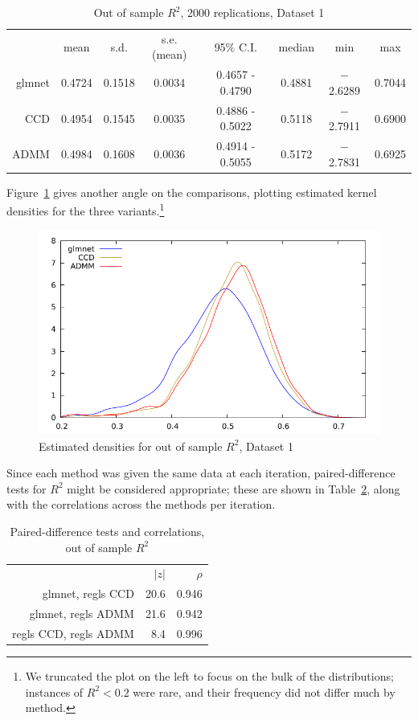 \documentclass{article}
\begin{document}
\begin{table}[htbp]
  \centering
  \begin{tabular}{rccccccc}
 & mean & s.d. & s.e.(mean) & 95\% C.I. & median & min & max \\
      glmnet & 0.4724 & 0.1518 & 0.0034 & 0.4657 - 0.4790 & 0.4881 & $-$2.6289 & 0.7044 \\
        CCD & 0.4954 & 0.1545 & 0.0035 & 0.4886 - 0.5022 & 0.5118 & $-$2.7911 & 0.6900 \\
       ADMM & 0.4984 & 0.1608 & 0.0036 & 0.4914 - 0.5055 & 0.5172 & $-$2.7831 & 0.6925 \\
  \end{tabular}
  \caption{Out of sample $R^2$, 2000 replications, Dataset 1}
  \label{tab:dset1}
\end{table}

Figure~\ref{fig:dset1} gives another angle on the comparisons,
plotting estimated kernel densities for the three
variants.\footnote{We truncated the plot on the left to focus on the
  bulk of the distributions; instances of $R^2 < 0.2$ were rare, and
  their frequency did not differ much by method.}

\begin{figure}[htbp]
  \centering
  \includegraphics[scale=0.9]{murder_kd3.pdf}
  \caption{Estimated densities for out of sample $R^2$, Dataset 1}
  \label{fig:dset1}
\end{figure}

Since each method was given the same data at each iteration,
paired-difference tests for $R^2$ might be considered appropriate;
these are shown in Table~\ref{tab:paired}, along with the correlations
across the methods per iteration.

\begin{table}[htbp]
\begin{center}
  \begin{tabular}{rrr}
    & $|z|$ & $\rho$ \\[4pt]
glmnet, regls CCD & 20.6 & 0.946 \\
glmnet, regls ADMM & 21.6 & 0.942 \\
regls CCD, regls ADMM & 8.4 & 0.996 \\
  \end{tabular}
  \caption{Paired-difference tests and correlations, out of sample $R^2$}
  \label{tab:paired}
\end{center}
\end{table}
\end{document}
